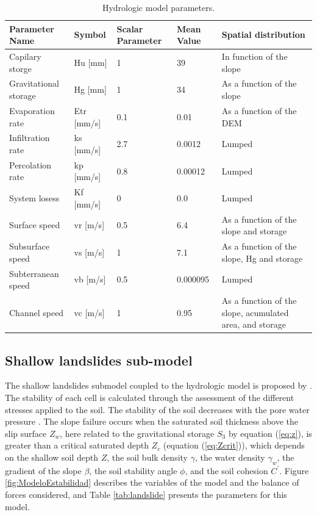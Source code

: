 \documentclass[hess, manuscript]{copernicus}
\begin{document}
\begin{table}[]
        \centering
        \begin{tabularx}{\textwidth}{p{3cm} p{2.2cm} p{1.5cm} p{2cm} p{3.5cm}}
\hline
Parameter Name & Symbol & Scalar Parameter & Mean Value & Spatial distribution \\
\hline
Capilary storge & Hu [mm] & 1 & 39 & In function of the slope \\
Gravitational storage & Hg [mm] & 1 & 34 & As a function of the slope \\
Evaporation rate & Etr [mm/s] & 0.1 & 0.01 & As a function of the DEM \\
Infiltration rate & ks [mm/s] & 2.7 & 0.0012 & Lumped \\
Percolation rate & kp [mm/s] & 0.8 & 0.00012 & Lumped \\
System losess & Kf [mm/s] & 0 & 0.0 & Lumped \\
Surface speed & vr [m/s] & 0.5 & 6.4 & As a function of the slope and storage \\
Subsurface speed & vs [m/s] & 1 & 7.1 & As a function of the slope, Hg and storage\\
Subterranean speed & vb [m/s] & 0.5 & 0.000095 & Lumped \\
Channel speed & vc [m/s] & 1 & 0.95 & As a function of the slope, acumulated area, and storage \\
\hline
\end{tabularx}
        \caption{Hydrologic model parameters.}
        \label{tab:parameters}
    \end{table}

\subsection{Shallow landslides sub-model}

The shallow landslides submodel coupled to the hydrologic model is proposed by  \citeauthor{Aristizabal2016}.  The stability of each cell is calculated through the assessment of the different stresses applied to the soil. The stability of the soil decreases with the pore water pressure \citep{Graham1984}. The slope failure occurs when the saturated soil thickness above the slip surface $Z_w$, here related to the gravitational storage $S_3$ by equation (\ref{eq:z}), is greater than a critical saturated depth $Z_c$ (equation (\ref{eq:Zcrit})), which depends on the shallow soil depth $Z$, the soil bulk density $\gamma$, the water density $\gamma_w$, the gradient of the slope $\beta$, the soil stability angle $\phi$, and the soil cohesion $C^{'}$.  Figure \ref{fig:ModeloEstabilidad} describes the variables of the model and the balance of forces considered, and Table \ref{tab:landslide} presents the parameters for this model.
\end{document}
